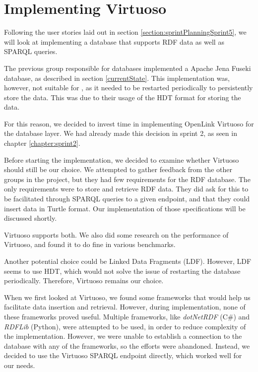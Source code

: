 \section{Implementing Virtuoso}\label{sec:implementing_virtuoso}
Following the user stories laid out in section \ref{section:sprintPlanningSprint5}, we will look at implementing a database that supports RDF data as well as SPARQL queries.

The previous group responsible for \knox{} databases implemented a Apache Jena Fuseki database, as described in section \ref{currentState}.
This implementation was, however, not suitable for \knox{}, as it needed to be restarted periodically to persistently store the data. This was due to their usage of the HDT format for storing the data\cite{knox2020}.

For this reason, we decided to invest time in implementing OpenLink Virtuoso\cite{OpenLinkSoftwareVirtuoso} for the \knox{} database layer. We had already made this decision in sprint 2, as seen in chapter \ref{chapter:sprint2}.

Before starting the implementation, we decided to examine whether Virtuoso should still be our choice.
We attempted to gather feedback from the other groups in the \knox{} project, but they had few requirements for the RDF database. The only requirements were to store and retrieve RDF data.
They did ask for this to be facilitated through SPARQL queries to a given endpoint, and that they could insert data in Turtle format. Our implementation of those specifications will be discussed shortly.

Virtuoso supports both. We also did some research on the performance of Virtuoso, and found it to do fine in various benchmarks\cite{addleseeComparingLinkedData2019}\cite{jovanovikBenchmarkingVirtuosoMighty2018}.

Another potential choice could be Linked Data Fragments (LDF). However, LDF seems to use HDT\cite{HostServerTriple}, which would not solve the issue of restarting the database periodically. Therefore, Virtuoso remains our choice.

When we first looked at Virtuoso, we found some frameworks that would help us facilitate data insertion and retrieval.  However, during implementation, none of these frameworks proved useful. Multiple frameworks, like \textit{dotNetRDF} (C\#) and \textit{RDFLib} (Python), were attempted to be used, in order to reduce complexity of the implementation. However, we were unable to establish a connection to the database with any of the frameworks, so the efforts were abandoned. Instead, we decided to use the Virtuoso SPARQL endpoint directly, which worked well for our needs.

